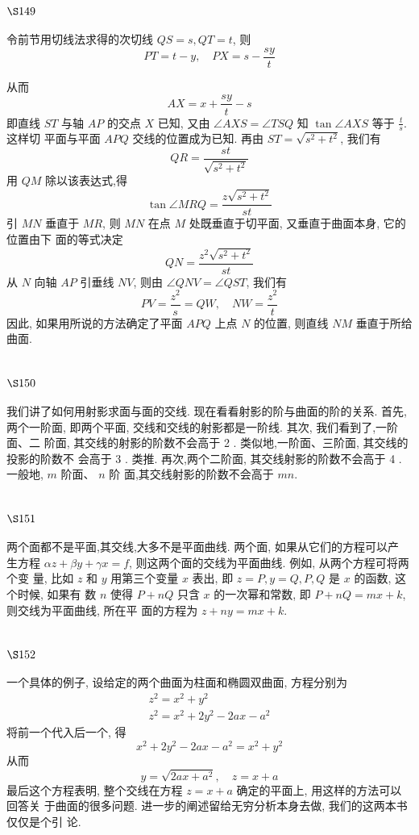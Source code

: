 \section{$\S 149$}

令前节用切线法求得的次切线 $Q S=s, Q T=t$, 则 
\[
P T=t-y, \quad P X=s-\frac{s y}{t}
\]

从而
\[
A X=x+\frac{s y}{t}-s
\]
即直线 $S T$ 与轴 $A P$ 的交点 $X$ 已知, 又由 $\angle A X S=\angle T S Q$ 知 $\tan \angle A X S$ 等于 $\frac{t}{s}$. 这样切 平面与平面 $A P Q$ 交线的位置成为已知. 再由 $S T=\sqrt{s^{2}+t^{2}}$, 我们有
\[
Q R=\frac{s t}{\sqrt{s^{2}+t^{2}}}
\]
用 $Q M$ 除以该表达式,得
\[
\tan \angle M R Q=\frac{z \sqrt{s^{2}+t^{2}}}{s t}
\]
引 $M N$ 垂直于 $M R$, 则 $M N$ 在点 $M$ 处既垂直于切平面, 又垂直于曲面本身, 它的位置由下 面的等式决定
\[
Q N=\frac{z^{2} \sqrt{s^{2}+t^{2}}}{s t}
\]
从 $N$ 向轴 $A P$ 引垂线 $N V$, 则由 $\angle Q N V=\angle Q S T$, 我们有
\[
P V=\frac{z^{2}}{s}=Q W, \quad N W=\frac{z^{2}}{t}
\]
因此, 如果用所说的方法确定了平面 $A P Q$ 上点 $N$ 的位置, 则直线 $N M$ 垂直于所给曲面.

\section{$\S 150$}

我们讲了如何用射影求面与面的交线. 现在看看射影的阶与曲面的阶的关系. 首先, 两个一阶面, 即两个平面, 交线和交线的射影都是一阶线. 其次, 我们看到了,一阶面、二 阶面, 其交线的射影的阶数不会高于 2 . 类似地,一阶面、三阶面, 其交线的投影的阶数不 会高于 3 . 类推. 再次,两个二阶面, 其交线射影的阶数不会高于 4 . 一般地, $m$ 阶面、 $n$ 阶 面,其交线射影的阶数不会高于 $m n$.

\section{$\S 151$}

两个面都不是平面,其交线,大多不是平面曲线. 两个面, 如果从它们的方程可以产 生方程 $\alpha z+\beta y+\gamma x=f$, 则这两个面的交线为平面曲线. 例如, 从两个方程可将两个变 量, 比如 $z$ 和 $y$ 用第三个变量 $x$ 表出, 即 $z=P, y=Q, P, Q$ 是 $x$ 的函数, 这个时候, 如果有 数 $n$ 使得 $P+n Q$ 只含 $x$ 的一次幂和常数, 即 $P+n Q=m x+k$, 则交线为平面曲线, 所在平 面的方程为 $z+n y=m x+k$. 

\section{$\S 152$}

一个具体的例子, 设给定的两个曲面为柱面和椭圆双曲面, 方程分别为
\[
\begin{gathered}
z^{2}=x^{2}+y^{2} \\
z^{2}=x^{2}+2 y^{2}-2 a x-a^{2}
\end{gathered}
\]
将前一个代入后一个, 得
\[
x^{2}+2 y^{2}-2 a x-a^{2}=x^{2}+y^{2}
\]
从而
\[
y=\sqrt{2 a x+a^{2}}, \quad z=x+a
\]
最后这个方程表明, 整个交线在方程 $z=x+a$ 确定的平面上, 用这样的方法可以回答关 于曲面的很多问题. 进一步的阐述留给无穷分析本身去做, 我们的这两本书仅仅是个引 论.

